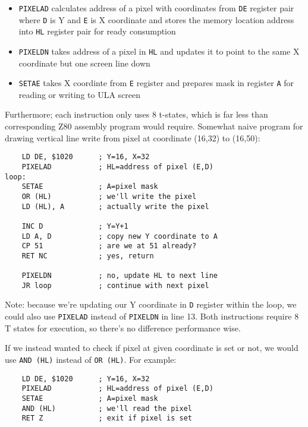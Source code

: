 \documentclass[12pt,twoside,openright,a4paper]{book}
\begin{document}
\begin{itemize}[topsep=1pt,itemsep=1pt]
	\item {\tt PIXELAD} calculates address of a pixel with coordinates from {\tt DE} register pair where {\tt D} is Y and {\tt E} is X coordinate and stores the memory location address into {\tt HL} register pair for ready consumption
	
	\item {\tt PIXELDN} takes address of a pixel in {\tt HL} and updates it to point to the same X coordinate but one screen line down
	
	\item {\tt SETAE} takes X coordinte from {\tt E} register and prepares mask in register {\tt A} for reading or writing to ULA screen
\end{itemize}

Furthermore; each instruction only uses 8 t-states, which is far less than corresponding Z80 assembly program would require. Somewhat naive program for drawing vertical line write from pixel at coordinate (16,32) to (16,50):

\begin{lstlisting}
	LD DE, $1020      ; Y=16, X=32
	PIXELAD           ; HL=address of pixel (E,D)
loop:
	SETAE             ; A=pixel mask
	OR (HL)           ; we'll write the pixel
	LD (HL), A        ; actually write the pixel
	
	INC D             ; Y=Y+1
	LD A, D           ; copy new Y coordinate to A
	CP 51             ; are we at 51 already?
	RET NC            ; yes, return

	PIXELDN           ; no, update HL to next line
	JR loop           ; continue with next pixel
\end{lstlisting}

Note: because we're updating our Y coordinate in {\tt D} register within the loop, we could also use {\tt PIXELAD} instead of {\tt PIXELDN} in line 13. Both instructions require 8 T states for execution, so there's no difference performance wise.

If we instead wanted to check if pixel at given coordinate is set or not, we would use {\tt AND (HL)} instead of {\tt OR (HL)}. For example:

\begin{lstlisting}
	LD DE, $1020      ; Y=16, X=32
	PIXELAD           ; HL=address of pixel (E,D)
	SETAE             ; A=pixel mask
	AND (HL)          ; we'll read the pixel
	RET Z             ; exit if pixel is set
\end{lstlisting}
\end{document}
